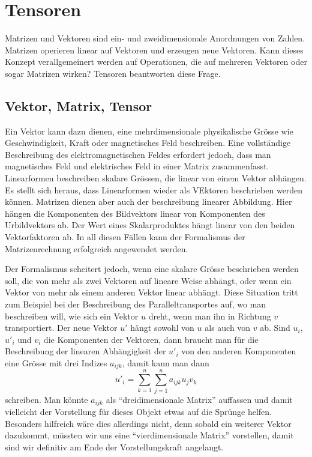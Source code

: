 %
%
%
\chapter{Tensoren}
\rhead{}
Matrizen und Vektoren sind ein- und zweidimensionale Anordnungen von
Zahlen.
Matrizen operieren linear auf Vektoren und erzeugen neue Vektoren.
Kann dieses Konzept verallgemeinert werden auf Operationen, die
auf mehreren Vektoren oder sogar Matrizen wirken?
Tensoren beantworten diese Frage.

\section{Vektor, Matrix, Tensor}
Ein Vektor kann dazu dienen, eine mehrdimensionale physikalische
Grösse wie Geschwindigkeit, Kraft oder magnetisches Feld beschreiben.
Eine vollständige Beschreibung des elektromagnetischen Feldes erfordert
jedoch, dass man magnetisches Feld und elektrisches Feld in einer
Matrix zusammenfasst.
Linearformen beschreiben skalare Grössen, die linear von einem 
Vektor abhängen.
Es stellt sich heraus, dass Linearformen wieder als VEktoren beschrieben
werden  können.
Matrizen dienen aber auch der beschreibung linearer Abbildung.
Hier hängen die Komponenten des Bildvektors linear von Komponenten
des Urbildvektors ab.
Der Wert eines Skalarproduktes hängt linear von den beiden Vektorfaktoren ab.
In all diesen Fällen kann der Formalismus der Matrizenrechnung erfolgreich
angewendet werden.

Der Formalismus scheitert jedoch, wenn eine skalare Grösse beschrieben
werden soll, die von mehr als zwei Vektoren auf lineare Weise abhängt,
oder wenn ein Vektor von mehr als einem anderen Vektor linear abhängt.
Diese Situation tritt zum Beispiel bei der Beschreibung des
Paralleltransportes auf, wo man beschreiben will, wie sich ein Vektor 
$u$ dreht, wenn man ihn in Richtung $v$ transportiert.
Der neue Vektor $u'$ hängt sowohl von $u$ als auch von $v$ ab.
Sind $u_i$, $u'_i$ und $v_i$ die Komponenten der Vektoren, dann
braucht man für die Beschreibung der linearen Abhängigkeit der $u'_i$
von den anderen Komponenten eine Grösse mit drei Indizes $a_{ijk}$,
damit kann man dann
\begin{equation}
u'_i = \sum_{k=1}^n\sum_{j=1}^n a_{ijk}u_jv_k
\label{tensor:beispiel:summe}
\end{equation}
schreiben.
Man könnte $a_{ijk}$ als ``dreidimensionale Matrix'' auffassen und
damit vielleicht der Vorstellung für dieses Objekt etwas auf die Sprünge
helfen.
Besonders hilfreich wäre dies allerdings nicht, denn sobald ein weiterer
Vektor dazukommt, müssten wir uns eine ``vierdimensionale Matrix''
vorstellen, damit sind wir definitiv am Ende der Vorstellungskraft
angelangt.

